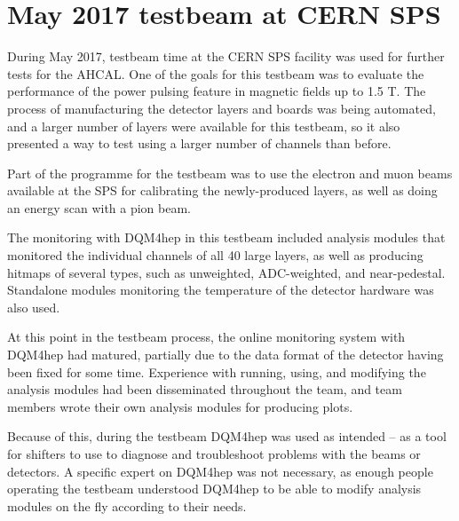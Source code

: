 \section{May 2017 testbeam at CERN SPS} %


During May 2017, testbeam time at the \acrshort{CERN} \acrfull{SPS} facility was used for further tests for the \acrshort{AHCAL}. One of the goals for this testbeam was to evaluate the performance of the power pulsing feature in magnetic fields up to 1.5 T. The process of manufacturing the detector layers and boards was being automated, and a larger number of layers were available for this testbeam, so it also presented a way to test using a larger number of channels than before. 

Part of the programme for the testbeam was to use the electron and muon beams available at the \acrshort{SPS} for calibrating the newly-produced layers, as well as doing an energy scan with a pion beam.

The monitoring with \acrshort{DQM4hep} in this testbeam included analysis modules that monitored the individual channels of all 40 large layers, as well as producing hitmaps of several types, such as unweighted, \acrshort{ADC}-weighted, and near-pedestal. Standalone modules monitoring the temperature of the detector hardware was also used. 

At this point in the testbeam process, the online monitoring system with \acrshort{DQM4hep} had matured, partially due to the data format of the detector having been fixed for some time. Experience with running, using, and modifying the analysis modules had been disseminated throughout the team, and team members wrote their own analysis modules for producing plots.

Because of this, during the testbeam \acrshort{DQM4hep} was used as intended -- as a tool for shifters to use to diagnose and troubleshoot problems with the beams or detectors. A specific expert on \acrshort{DQM4hep} was not necessary, as enough people operating the testbeam understood \acrshort{DQM4hep} to be able to modify analysis modules on the fly according to their needs.


